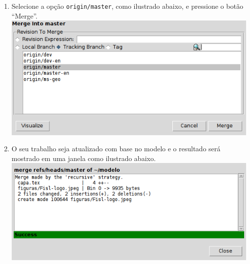 \begin{enumerate}
  \item Selecione a opção \lstinline+origin/master+, como ilustrado abaixo, e
    pressione o botão ``Merge''.\\
    \includegraphics[scale=.6]{figuras/git-gui10}
  \item O seu trabalho seja atualizado com base no modelo e o resultado será
    mostrado em uma janela como ilustrado abaixo.\\
    \includegraphics[scale=.6]{figuras/git-gui11}
\end{enumerate}
